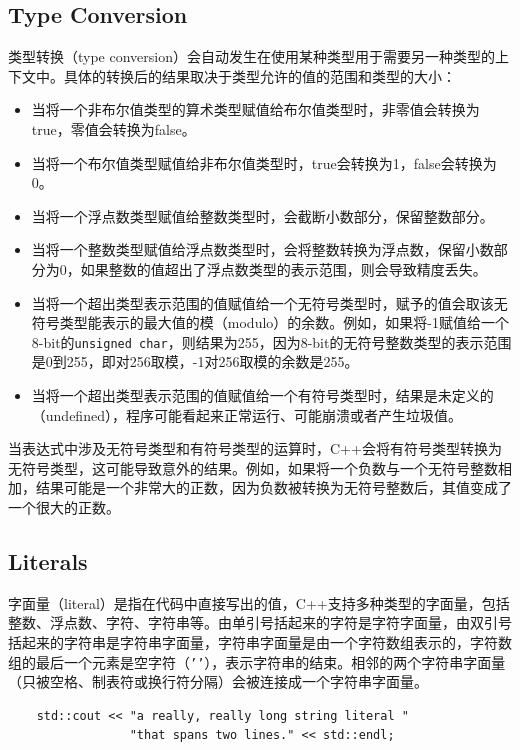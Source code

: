 \subsection{Type Conversion}
类型转换（type conversion）会自动发生在使用某种类型用于需要另一种类型的上下文中。具体的转换后的结果取决于类型允许的值的范围和类型的大小：

\begin{itemize}
    \item 当将一个非布尔值类型的算术类型赋值给布尔值类型时，非零值会转换为true，零值会转换为false。
    \item 当将一个布尔值类型赋值给非布尔值类型时，true会转换为1，false会转换为0。
    \item 当将一个浮点数类型赋值给整数类型时，会截断小数部分，保留整数部分。
    \item 当将一个整数类型赋值给浮点数类型时，会将整数转换为浮点数，保留小数部分为0，如果整数的值超出了浮点数类型的表示范围，则会导致精度丢失。
    \item 当将一个超出类型表示范围的值赋值给一个无符号类型时，赋予的值会取该无符号类型能表示的最大值的模（modulo）的余数。例如，如果将-1赋值给一个8-bit的\texttt{unsigned char}，则结果为255，因为8-bit的无符号整数类型的表示范围是0到255，即对256取模，-1对256取模的余数是255。
    \item 当将一个超出类型表示范围的值赋值给一个有符号类型时，结果是未定义的（undefined），程序可能看起来正常运行、可能崩溃或者产生垃圾值。
\end{itemize}

当表达式中涉及无符号类型和有符号类型的运算时，C++会将有符号类型转换为无符号类型，这可能导致意外的结果。例如，如果将一个负数与一个无符号整数相加，结果可能是一个非常大的正数，因为负数被转换为无符号整数后，其值变成了一个很大的正数。

\subsection{Literals}
字面量（literal）是指在代码中直接写出的值，C++支持多种类型的字面量，包括整数、浮点数、字符、字符串等。由单引号括起来的字符是字符字面量，由双引号括起来的字符串是字符串字面量，字符串字面量是由一个字符数组表示的，字符数组的最后一个元素是空字符（\texttt{'\0'}），表示字符串的结束。相邻的两个字符串字面量（只被空格、制表符或换行符分隔）会被连接成一个字符串字面量。

\begin{verbatim}
    std::cout << "a really, really long string literal "
                 "that spans two lines." << std::endl;
\end{verbatim}


